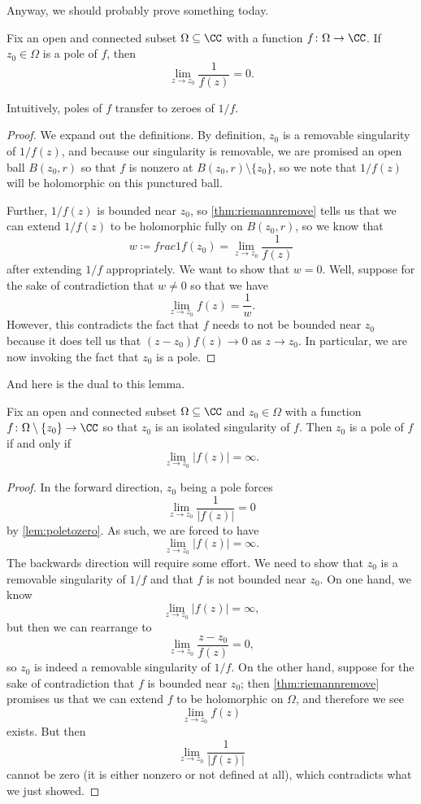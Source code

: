 Anyway, we should probably prove something today.
\begin{lemma} \label{lem:poletozero}
	Fix an open and connected subset $\Omega\subseteq\CC$ with a function $f\colon \Omega\to\CC$. If $z_0\in\Omega$ is a pole of $f$, then
	\[\lim_{z\to z_0}\frac1{f(z)}=0.\]
\end{lemma}
Intuitively, poles of $f$ transfer to zeroes of $1/f$.
\begin{proof}
	We expand out the definitions. By definition, $z_0$ is a removable singularity of $1/f(z)$, and because our singularity is removable, we are promised an open ball $B(z_0,r)$ so that $f$ is nonzero at $B(z_0,r)\setminus\{z_0\}$, so we note that $1/f(z)$ will be holomorphic on this punctured ball.
	
	Further, $1/f(z)$ is bounded near $z_0$, so \autoref{thm:riemannremove} tells us that we can extend $1/f(z)$ to be holomorphic fully on $B(z_0,r)$, so we know that
	\[w\coloneqq frac1{f(z_0)}=\lim_{z\to z_0}\frac1{f(z)}\]
	after extending $1/f$ appropriately. We want to show that $w=0$. Well, suppose for the sake of contradiction that $w\ne0$ so that we have
	\[\lim_{z\to z_0}f(z)=\frac1w.\]
	However, this contradicts the fact that $f$ needs to not be bounded near $z_0$ because it does tell us that $(z-z_0)f(z)\to0$ as $z\to z_0$. In particular, we are now invoking the fact that $z_0$ is a pole.
\end{proof}
And here is the dual to this lemma.
\begin{lemma}
	Fix an open and connected subset $\Omega\subseteq\CC$ and $z_0\in\Omega$ with a function $f\colon \Omega\setminus\{z_0\}\to\CC$ so that $z_0$ is an isolated singularity of $f$. Then $z_0$ is a pole of $f$ if and only if
	\[\lim_{z\to z_0}|f(z)|=\infty.\]
\end{lemma}
\begin{proof}
	In the forward direction, $z_0$ being a pole forces
	\[\lim_{z\to z_0}\frac1{|f(z)|}=0\]
	by \autoref{lem:poletozero}. As such, we are forced to have
	\[\lim_{z\to z_0}|f(z)|=\infty.\]
	The backwards direction will require some effort. We need to show that $z_0$ is a removable singularity of $1/f$ and that $f$ is not bounded near $z_0$. On one hand, we know
	\[\lim_{z\to z_0}|f(z)|=\infty,\]
	but then we can rearrange to
	\[\lim_{z\to z_0}\frac{z-z_0}{f(z)}=0,\]
	so $z_0$ is indeed a removable singularity of $1/f$. On the other hand, suppose for the sake of contradiction that $f$ is bounded near $z_0$; then \autoref{thm:riemannremove} promises us that we can extend $f$ to be holomorphic on $\Omega$, and therefore we see
	\[\lim_{z\to z_0}f(z)\]
	exists. But then
	\[\lim_{z\to z_0}\frac1{|f(z)|}\]
	cannot be zero (it is either nonzero or not defined at all), which contradicts what we just showed.
\end{proof}

